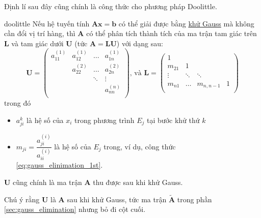 \documentclass[../../Lectures]{subfiles}
\begin{document}
Định lí sau đây cũng chính là công thức cho phương pháp Doolittle.

\begin{ctheorem}{}{doolittle}
    Nếu hệ tuyến tính \(\bm{Ax} = \bm{b}\) có thể giải được bằng
    \hyperref[method:gauss_elimination]{khử Gauss} mà không cần đổi vị trí hàng,
    thì \(\bm{A}\) có thể phân tích thành tích của ma trận tam giác trên
    \(\bm{L}\) và tam giác dưới \(\bm{U}\) (tức \(\bm{A} = \bm{LU}\)) với dạng
    sau:
    \[
        \bm{U} =
            \begin{pmatrix}
                a_{11}^{(1)}  &  a_{12}^{(1)}  &  \dots   &  a_{1n}^{(1)}  \\
                              &  a_{22}^{(2)}  &  \dots   &  a_{2n}^{(2)}  \\
                              &                &  \ddots  &     \vdots     \\
                              &                &          &  a_{nn}^{(n)}  \\
            \end{pmatrix}
        \text{, và }
        \bm{L} =
            \begin{pmatrix}
                    1   &          &                &     \\
                m_{21}  &     1    &                &     \\
                \vdots  &  \ddots  &     \ddots     &     \\
                m_{n1}  &  \dots   &  m_{n, n - 1}  &  1  \\
            \end{pmatrix}
    \]
    trong đó
    \begin{itemize}
        \item \(a_{ji}^{k}\) là hệ số của \(x_i\) trong phương trình \(E_j\) tại
            bước khử thứ \(k\)

        \item \(m_{ji} = \dfrac{a_{ji}^{(i)}}{a_{ii}^{(i)}}\) là hệ số của
            \(E_j\) trong, ví dụ, công thức \eqref{eq:gauss_elinimation_1st}.
    \end{itemize}

    \(\bm{U}\) cũng chính là ma trận \(\bm{A}\) thu được sau khi khử Gauss.
\end{ctheorem}

Chú ý rằng \(\bm{U}\) là \(\bm{A}\) sau khi khử Gauss, tức ma trận
\(\bm{\tilde{A}}\) trong phần \ref{sec:gauss_elimination} nhưng bỏ đi cột cuối.
\end{document}
